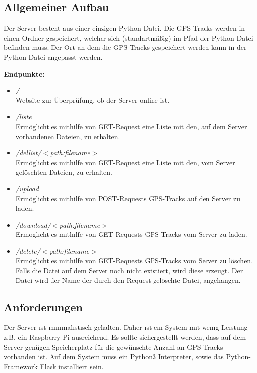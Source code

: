 \documentclass{article}
\begin{document}
\subsection{Allgemeiner Aufbau}
Der Server besteht aus einer einzigen Python-Datei.
Die GPS-Tracks werden in einen Ordner  gespeichert,
welcher sich (standartmäßig) im Pfad der Python-Datei befinden muss.
Der Ort an dem die GPS-Tracks gespeichert werden kann in der Python-Datei
angepasst werden. \\ \par
\textbf{Endpunkte:}
\begin{itemize}
    \item \textit{/} \\ Website zur Überprüfung, ob der Server online ist.
    \item \textit{/liste} \\ Ermöglicht es mithilfe von GET-Request eine Liste
        mit den, auf dem Server vorhandenen Dateien, zu erhalten.
    \item \textit{/dellist/}$<$\textit{path:filename}$>$ \\ Ermöglicht es 
        mithilfe von GET-Request eine Liste
        mit den, vom Server gelöschten Dateien, zu erhalten.
    \item \textit{/upload} \\  Ermöglicht es mithilfe von POST-Requests GPS-Tracks 
        auf den Server zu laden.
    \item \textit{/download/}$<$\textit{path:filename}$>$ \\  Ermöglicht es mithilfe
        von GET-Requests GPS-Tracks vom Server zu laden.
    \item \textit{/delete/}$<$\textit{path:filename}$>$  \\
        Ermöglicht es mithilfe von GET-Requests GPS-Tracks 
        vom Server zu löschen. Falls die Datei  auf dem Server noch
        nicht existiert, wird diese erzeugt. Der Datei  wird 
        der Name der durch den Request gelöschte Datei, angehangen.
\end{itemize}
\subsection{Anforderungen}
Der Server ist minimalistisch gehalten. Daher ist ein System mit wenig 
Leistung z.B. ein Raspberry Pi ausreichend. Es sollte sichergestellt 
werden, dass auf dem Server genügen Speicherplatz für die gewünschte Anzahl an 
GPS-Tracks vorhanden ist. Auf dem System muss ein Python3 Interpreter, sowie das 
Python-Framework Flask installiert sein.
\end{document}
